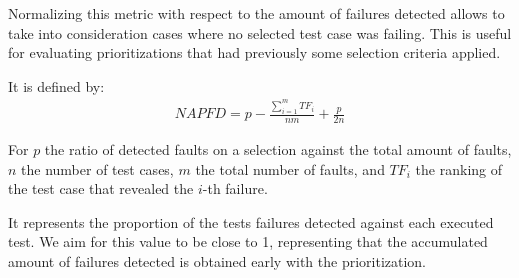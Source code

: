 Normalizing this metric with respect to the amount of failures detected allows to take into consideration cases where no
selected test case was failing. This is useful for evaluating prioritizations that had previously some selection criteria applied.

It is defined by:
\begin{align*}
NAPFD = p - \frac{\sum_{i=1}^mTF_i}{nm} + \frac{p}{2n}
\end{align*}

For $p$ the ratio of detected faults on a selection against the total amount of faults,
$n$ the number of test cases, $m$ the total number of faults, and $TF_i$ the ranking of
the test case that revealed the $i$-th failure.

It represents the proportion of the tests failures detected against each executed test.
We aim for this value to be close to 1, representing that the accumulated amount of 
failures detected is obtained early with the prioritization.